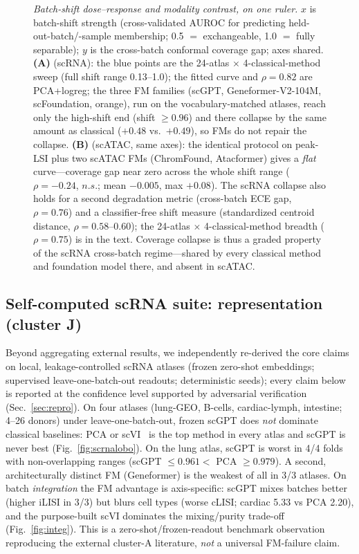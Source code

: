 \documentclass[fleqn,10pt,lineno]{wlpeerj}  %
\newcommand{\fitfig}[1]{\resizebox{\ifdim\width>\linewidth\linewidth\else\width\fi}{!}{#1}}
\begin{document}
\begin{figure}[htb]\centering\fitfig{}
\caption{\emph{Batch-shift dose--response and modality contrast, on one ruler.} $x$ is batch-shift strength (cross-validated AUROC for predicting held-out-batch/-sample membership; 0.5 $=$ exchangeable, 1.0 $=$ fully separable); $y$ is the cross-batch conformal coverage gap; axes shared. \textbf{(A)} (scRNA): the blue points are the 24-atlas $\times$ 4-classical-method sweep (full shift range 0.13--1.0); the fitted curve and $\rho=0.82$ are PCA+logreg; the three FM families (scGPT, Geneformer-V2-104M, scFoundation, orange), run on the vocabulary-matched atlases, reach only the high-shift end (shift $\ge 0.96$) and there collapse by the same amount as classical ($+0.48$ vs.\ $+0.49$), so FMs do not repair the collapse. \textbf{(B)} (scATAC, same axes): the identical protocol on peak-LSI plus two scATAC FMs (ChromFound, Atacformer) gives a \emph{flat} curve---coverage gap near zero across the whole shift range ($\rho=-0.24$, $n.s.$; mean $-0.005$, max $+0.08$). The scRNA collapse also holds for a second degradation metric (cross-batch ECE gap, $\rho=0.76$) and a classifier-free shift measure (standardized centroid distance, $\rho=0.58$--$0.60$); the 24-atlas $\times$ 4-classical-method breadth ($\rho=0.75$) is in the text. Coverage collapse is thus a graded property of the scRNA cross-batch regime---shared by every classical method and foundation model there, and absent in scATAC.}\label{fig:batchdose}\end{figure}

\subsection{Self-computed scRNA suite: representation (cluster J)}
Beyond aggregating external results, we independently re-derived the core claims on local, leakage-controlled scRNA atlases (frozen zero-shot embeddings; supervised leave-one-batch-out readouts; deterministic seeds); every claim below is reported at the confidence level supported by adversarial verification (Sec.~\ref{sec:repro}).
On four atlases (lung-GEO, B-cells, cardiac-lymph, intestine; 4--26 donors) under leave-one-batch-out, frozen scGPT does \emph{not} dominate classical baselines: PCA or scVI~\cite{lopez2018} is the top method in every atlas and scGPT is never best (Fig.~\ref{fig:scrnalobo}). On the lung atlas, scGPT is worst in 4/4 folds with non-overlapping ranges (scGPT $\le 0.961 < $ PCA $\ge 0.979$). A second, architecturally distinct FM (Geneformer) is the weakest of all in 3/3 atlases. On batch \emph{integration} the FM advantage is axis-specific: scGPT mixes batches better (higher iLISI in 3/3) but blurs cell types (worse cLISI; cardiac 5.33 vs PCA 2.20), and the purpose-built scVI dominates the mixing/purity trade-off (Fig.~\ref{fig:integ}). This is a zero-shot/frozen-readout benchmark observation reproducing the external cluster-A literature, \emph{not} a universal FM-failure claim.
\end{document}
